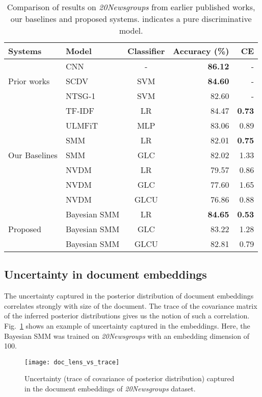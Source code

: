 \documentclass[journal]{IEEEtran}
\begin{document}
\begin{table}[!t]
	\begin{center}
		\caption{\label{tab:res2}Comparison of results on 
		\textit{20Newsgroups} from earlier published works, our baselines and 
		proposed systems.  indicates a pure discriminative model.}
		\begin{tabular}{llcrr} \toprule
 		\bf{Systems} & \bf{Model} & \bf{Classifier} & \bf{Accuracy (\%)} & \bf{CE} \\
		\midrule
  \multirow{3}{*}{Prior works} & CNN~\cite{Raghu:2018:CNN}  & 
  	- & \textbf{86.12} 	& - \\
 & SCDV~\cite{Mekala:2017:SCDV} & SVM  &  \textbf{84.60} & - \\
 &	NTSG-1~\cite{Liu:2015:NTSG} & SVM  &  82.60 & -  \\ \midrule
 \multirow{7}{*}{Our Baselines} & TF-IDF   & LR  & 84.47 & \textbf{0.73}  \\
 & ULMFiT  & MLP  & 83.06 & 0.89 \\ \cmidrule{2-5}
 &	 SMM  & LR   & 82.01 & \textbf{0.75} \\
 &	 SMM  & GLC  & 82.02 &  1.33 \\  \cmidrule{2-5}
 & NVDM             & LR   & 79.57 & 0.86 \\
 & NVDM             & GLC  & 77.60 & 1.65\\
 & NVDM             & GLCU & 76.86 & 0.88 \\	\midrule
 \multirow{3}{*}{Proposed} & Bayesian SMM & LR & \textbf{84.65} & \textbf{0.53} 
 \\
 & Bayesian SMM           & GLC    &  83.22 & 1.28 \\
 & Bayesian SMM           & GLCU   &  82.81 & 0.79 \\
	\bottomrule
 \end{tabular}
 \end{center}
\end{table}
\subsection{Uncertainty in document embeddings}
\label{ssec:uncert}
The uncertainty captured in the posterior distribution of document embeddings
correlates strongly with size of the document. The trace of the covariance matrix of the inferred posterior distributions gives us the notion of such a correlation. Fig.~\ref{fig:trace} shows an example of uncertainty captured in
the embeddings. Here, the Bayesian SMM was trained on \textit{20Newsgroups} 
with an embedding dimension of 100. 
\begin{figure}[ht!]
	\centering
	\texttt{[image: doc\_lens\_vs\_trace]}
	\caption{\label{fig:trace} Uncertainty (trace of covariance of posterior 
		distribution) captured in the document embeddings of 
		\textit{20Newsgroups} dataset.}
\end{figure}
\end{document}
